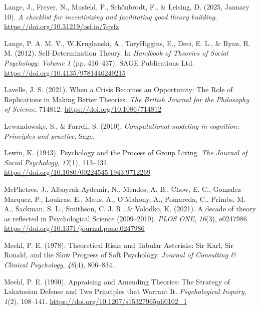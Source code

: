 \documentclass[
  man, noextraspace,floatsintext]{apa7}
\newlength{\cslhangindent}
\newenvironment{CSLReferences}[2] %
 {\begin{list}{}{%
  \setlength{\itemindent}{0pt}
  \setlength{\leftmargin}{0pt}
  \setlength{\parsep}{0pt}
  \ifodd #1
   \setlength{\leftmargin}{\cslhangindent}
   \setlength{\itemindent}{-1\cslhangindent}
  \fi
  \setlength{\itemsep}{#2\baselineskip}}}
 {\end{list}}
\begin{document}
\begin{CSLReferences}{1}{0}
Lange, J., Freyer, N., Musfeld, P., Schönbrodt, F., \& Leising, D. (2025, January 10). \emph{A checklist for incentivizing and facilitating good theory building}. \url{https://doi.org/10.31219/osf.io/7qvfz}

Lange, P. A. M. V., W.Kruglanski, A., ToryHiggins, E., Deci, E. L., \& Ryan, R. M. (2012). Self-{Determination Theory}. In \emph{Handbook of {Theories} of {Social Psychology}: {Volume} 1} (pp. 416--437). SAGE Publications Ltd. \url{https://doi.org/10.4135/9781446249215}

Lavelle, J. S. (2021). When a {Crisis Becomes} an {Opportunity}: {The Role} of {Replications} in {Making Better Theories}. \emph{The British Journal for the Philosophy of Science}, 714812. \url{https://doi.org/10.1086/714812}

Lewandowsky, S., \& Farrell, S. (2010). \emph{Computational modeling in cognition: {Principles} and practice}. Sage.

Lewin, K. (1943). Psychology and the {Process} of {Group Living}. \emph{The Journal of Social Psychology}, \emph{17}(1), 113--131. \url{https://doi.org/10.1080/00224545.1943.9712269}

McPhetres, J., Albayrak-Aydemir, N., Mendes, A. B., Chow, E. C., Gonzalez-Marquez, P., Loukras, E., Maus, A., O'Mahony, A., Pomareda, C., Primbs, M. A., Sackman, S. L., Smithson, C. J. R., \& Volodko, K. (2021). A decade of theory as reflected in {Psychological Science} (2009--2019). \emph{PLOS ONE}, \emph{16}(3), e0247986. \url{https://doi.org/10.1371/journal.pone.0247986}

Meehl, P. E. (1978). Theoretical {Risks} and {Tabular Asterisks}: {Sir Karl}, {Sir Ronald}, and the {Slow Progress} of {Soft Psychology}. \emph{Journal of Consulting \& Clinical Psychology}, \emph{46}(4), 806--834.

Meehl, P. E. (1990). Appraising and {Amending Theories}: {The Strategy} of {Lakatosian Defense} and {Two Principles} that {Warrant It}. \emph{Psychological Inquiry}, \emph{1}(2), 108--141. \url{https://doi.org/10.1207/s15327965pli0102_1}


\end{CSLReferences}
\end{document}
